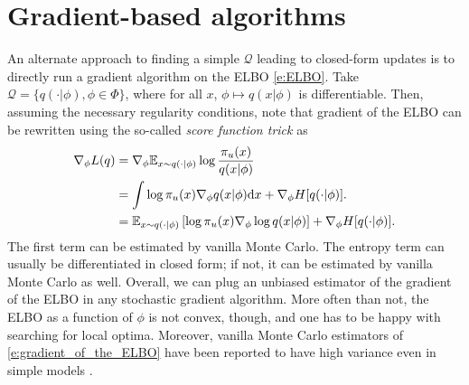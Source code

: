 \section{Gradient-based algorithms}
\label{s:gradient_based_VB}
An alternate approach to finding a simple $\mathcal Q$ leading to closed-form updates is to directly run a gradient algorithm on the ELBO \eqref{e:ELBO}.
Take $\mathcal{Q} = \{q(\cdot\vert\phi), \phi \in\Phi\}$, where for all $x$, $\phi\mapsto q(x\vert\phi)$ is differentiable.
Then, assuming the necessary regularity conditions, \cite{PaBlJo12} note that gradient of the ELBO can be rewritten using the so-called \emph{score function trick} as
\begin{align*}
\nabla_\phi L(q) 
&= \nabla_\phi \mathbb{E}_{x\sim q(\cdot\vert\phi)} \log \frac{\pi_u(x)}{q(x\vert\phi)}\\
&= \int \log \pi_u(x) \nabla_\phi q(x\vert\phi) \mathrm{d} x + \nabla_\phi H[q(\cdot\vert\phi)].\\
&= \mathbb E_{{x\sim q(\cdot\vert\phi)}} \left [\log \pi_u(x) \nabla_\phi \log q(x\vert\phi) \right ] + \nabla_\phi H[q(\cdot\vert\phi)].
\end{align*}
The first term can be estimated by vanilla Monte Carlo. 
The entropy term can usually be differentiated in closed form; if not, it can be estimated by vanilla Monte Carlo as well. 
Overall, we can plug an unbiased estimator of the gradient of the ELBO in any stochastic gradient algorithm. 
More often than not, the ELBO as a function of $\phi$ is not convex, though, and one has to be happy with searching for local optima. 
Moreover, vanilla Monte Carlo estimators of \eqref{e:gradient_of_the_ELBO} have been reported to have high variance even in simple models \citep{PaBlJo12}. 

